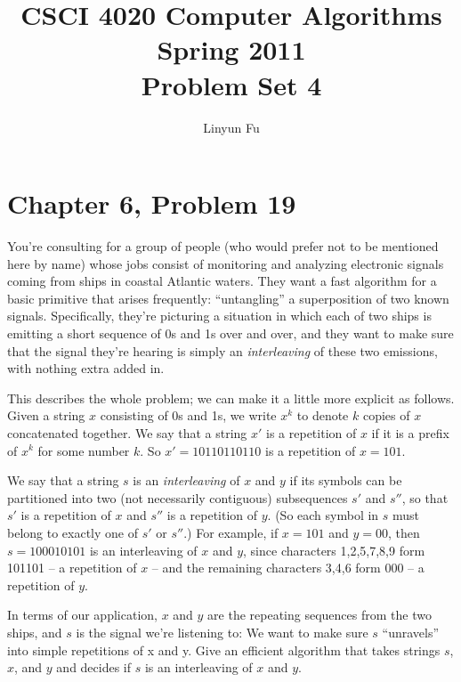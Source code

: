 \documentclass[12pt,letterpaper]{article}
\author{Linyun Fu}
\title{CSCI 4020 Computer Algorithms Spring 2011\\
Problem Set 4}
\begin{document}
\maketitle
\section*{Chapter 6, Problem 19}
You're consulting for a group of people (who would prefer not to be
mentioned here by name) whose jobs consist of monitoring and analyzing
electronic signals coming from ships in coastal Atlantic waters. They want
a fast algorithm for a basic primitive that arises frequently: ``untangling''
a superposition of two known signals. Specifically, they're picturing a
situation in which each of two ships is emitting a short sequence of 0s
and 1s over and over, and they want to make sure that the signal they're
hearing is simply an \emph{interleaving} of these two emissions, with nothing
extra added in.

This describes the whole problem; we can make it a little more explicit
as follows. Given a string $x$ consisting of 0s and 1s, we write $x^k$ to denote $k$
copies of $x$ concatenated together. We say that a string $x'$ is a repetition
of $x$ if it is a prefix of $x^k$ for some number $k$. So $x' = 10110110110$ is a repetition
of $x = 101$.

We say that a string $s$ is an \emph{interleaving} of $x$ and $y$ if its symbols can be
partitioned into two (not necessarily contiguous) subsequences $s'$ and $s''$,
so that $s'$ is a repetition of $x$ and $s''$ is a repetition of $y$. (So each symbol in
$s$ must belong to exactly one of $s'$ or $s''$.) For example, if $x = 101$ and $y = 00$,
then $s = 100010101$ is an interleaving of $x$ and $y$, since characters 1,2,5,7,8,9
form 101101 -- a repetition of $x$ -- and the remaining characters 3,4,6 form
000 -- a repetition of $y$.

In terms of our application, $x$ and $y$ are the repeating sequences from
the two ships, and $s$ is the signal we're listening to: We want to make sure
$s$ ``unravels'' into simple repetitions of x and y. Give an efficient algorithm
that takes strings $s$, $x$, and $y$ and decides if $s$ is an interleaving of $x$ and $y$.
\end{document}
